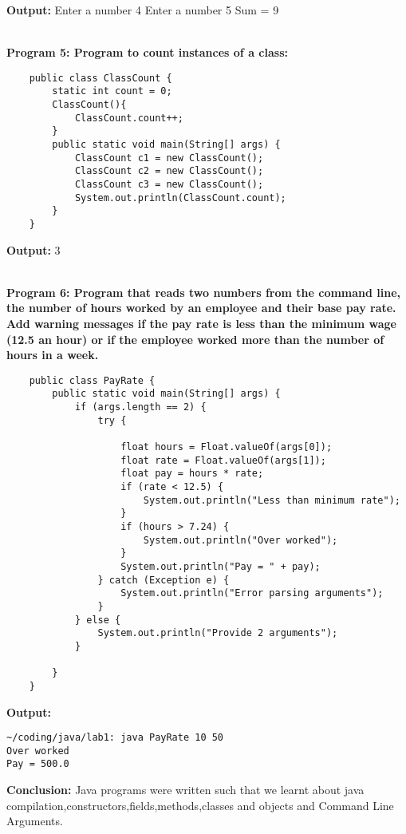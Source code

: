 \documentclass{book}
\begin{document}
{\begin{verbatim}
\end{verbatim}
\par
\textbf{Output:}
Enter a number
4
Enter a number
5
Sum = 9
\\
\\
\par
\textbf{Program 5: Program to count instances of a class:}
\begin{verbatim}
    public class ClassCount {
        static int count = 0;
        ClassCount(){
            ClassCount.count++;
        }
        public static void main(String[] args) {
            ClassCount c1 = new ClassCount();
            ClassCount c2 = new ClassCount();
            ClassCount c3 = new ClassCount();
            System.out.println(ClassCount.count);
        }
    }
\end{verbatim}
\par
\textbf{Output:}
3
\\
\\
\par
\textbf{Program 6: Program that reads two numbers from the command line, the number of hours worked by an  employee and their base pay rate. Add warning messages if the pay rate is less than the minimum wage (12.5 an hour) or if the employee worked more than the number of hours in a week.}
\begin{verbatim}
    public class PayRate {
        public static void main(String[] args) {
            if (args.length == 2) {
                try {

                    float hours = Float.valueOf(args[0]);
                    float rate = Float.valueOf(args[1]);
                    float pay = hours * rate;
                    if (rate < 12.5) {
                        System.out.println("Less than minimum rate");
                    }
                    if (hours > 7.24) {
                        System.out.println("Over worked");
                    }
                    System.out.println("Pay = " + pay);
                } catch (Exception e) {
                    System.out.println("Error parsing arguments");
                }
            } else {
                System.out.println("Provide 2 arguments");
            }

        }
    }
\end{verbatim}
\textbf{Output:}
\begin{verbatim}
~/coding/java/lab1: java PayRate 10 50
Over worked
Pay = 500.0
\end{verbatim}
\par
\textbf{Conclusion:}
    Java programs were written such that we learnt about java compilation,constructors,fields,methods,classes and objects and Command Line Arguments.
}
\end{document}
